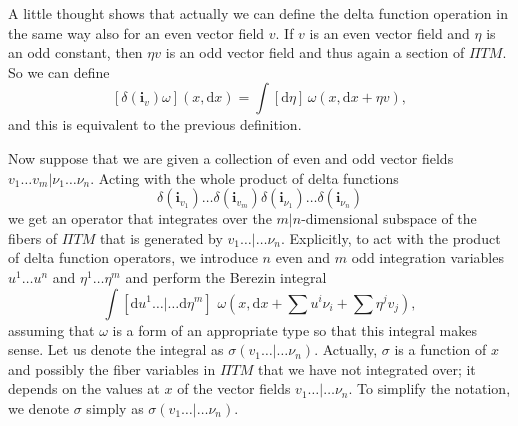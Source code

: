\documentclass[11pt,a4paper]{article}
\def\d{{\mathrm d}}
\def\i{{\mathbf i}}
\def\Pi{\varPi}
\begin{document}
A little thought shows that actually we can define the delta function operation in the same way also for an even vector field $v$.  If $v$ is an
even vector field and $\eta$ is an odd constant, then $\eta v$ is an odd vector field and thus again a section of ${\Pi} TM$.  So we can define
\begin{equation}\label{hono}[\delta(\i_v)\omega](x,\d x)=\int [\d \eta]\,\omega(x,\d x+ \eta v), \end{equation}
and this is equivalent to the previous definition.  

Now suppose that we are given a collection of even and odd vector fields $v_1\dots v_m|\nu_1\dots \nu_n$.   Acting with the whole product of
delta functions 
\begin{equation}\label{zormo}\delta(\i_{v_1})\dots\delta(\i_{v_m})\delta(\i_{\nu_1})\dots\delta(\i_{\nu_n}) \end{equation}
we get an operator that integrates over the $m|n$-dimensional subspace of the fibers of ${\Pi} TM$ that is generated by $v_1\dots|\dots\nu_n$.
Explicitly, to act with the product of delta function operators, we  introduce $n$ even and $m$ odd
integration variables $u^1\dots u^n$ and $\eta^1\dots \eta^m$
and perform the Berezin integral
\begin{equation}\label{ormo}\int[\d u^1\dots|\dots \d\eta^m]\,\,\omega\left(x,\d x+\sum u^i\nu_i+\sum \eta^j v_j\right),\end{equation}
assuming that $\omega$ is a form of an appropriate type so that this integral makes sense.
Let  us denote the integral as $\sigma(v_1\dots|\dots \nu_n)$.  Actually, $\sigma$ is a function of $x$ and possibly the fiber variables in ${\Pi} TM$
that we have not integrated over; it depends on the values at $x$ of the vector fields $v_1\dots|\dots\nu_n$.  To simplify the notation, we denote $\sigma$
simply as $\sigma(v_1\dots|\dots\nu_n)$.
\end{document}
